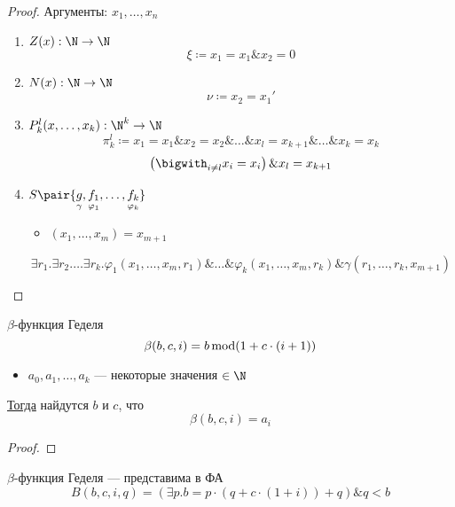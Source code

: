 \documentclass[english]{article}
\begin{document}
\begin{proof}
	Аргументы: \(x_1, \dots, x_n\)
	\begin{enumerate}
		\item \(Z(x): \N \to \N\)
		      \[ \xi \coloneqq x_1 = x_1 \& x_2 = 0 \]
		\item \(N(x): \N \to \N\)
		      \[ \nu \coloneqq x_2 = x_1' \]
		\item \(P_k^l(x, \dots, x_k): \N^k \to \N\)
		      \[ \pi_k^l \coloneqq x_1 = x_1 \& x_2 = x_2 \& \dots \& x_l = x_{k + 1} \& \dots \& x_k = x_k\]
		      \[ \left(\bigwith_{i \neq l} x_i = x_i\right) \& x_l = x_{k + 1} \]
		\item \(S\pair{\underset{\gamma}{g}, \underset{\varphi_1}{f_1}, \dots, \underset{\varphi_k}{f_k}}\)
		      \begin{itemize}
			      \item \((x_1, \dots, x_m) = x_{m + 1}\)
		      \end{itemize}
		      \[ \exists r_1. \exists r_2. \dots\exists r_k. \varphi_1(x_1, \dots, x_m, r_1) \& \dots \& \varphi_k(x_1, \dots, x_m, r_k) \& \gamma(r_1, \dots, r_k, x_{m + 1}) \]
	\end{enumerate}
	\label{org6deb492}
\end{proof}
\begin{definition}
	\(\beta\)-функция Геделя
	\[ \beta(b, c, i) = b \mathop{\rm mod} (1 + c\cdot(i + 1)) \]
	\label{org4e4d68b}
\end{definition}
\begin{theorem}
	\-
	\begin{itemize}
		\item \(a_0, a_1, \dots, a_k\) --- некоторые значения \(\in \N\)
	\end{itemize}
	\uline{Тогда} найдутся \(b\) и \(c\), что
	\[ \beta(b, c, i) = a_i \]
	\label{orgaf83556}
\end{theorem}
\begin{proof}
	\todo
\end{proof}
\begin{remark}
	\(\beta\)-функция Геделя --- представима в ФА
	\[ B(b, c, i, q) = (\exists p. b = p\cdot(q + c\cdot(1 + i)) + q) \& q < b \]
	\label{org7ff4c81}
\end{remark}
\end{document}
